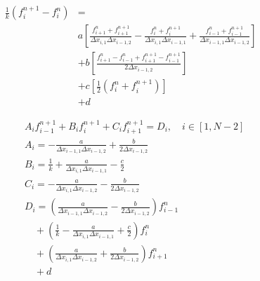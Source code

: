 \documentclass{article}
\begin{document}
    \begin{equation}
        \begin{split}
            \frac{1}{k}\left(f_i^{n+1} - f_i^n\right) &=
            \\
            & a \left[
                    \frac{f_{i+1}^n + f_{i+1}^{n+1}}
                        {\Delta x_{i,1} \Delta x_{i-1,2}}
                    - \frac{f_i^n + f_i^{n+1}}
                        {\Delta x_{i,1} \Delta x_{i-1,1}}
                    + \frac{f_{i-1}^n + f_{i-1}^{n+1}}
                        {\Delta x_{i-1,1} \Delta x_{i-1,2}}
                     \right]
            \\
            & + b \left[ 
                    \frac{f_{i+1}^n -f_{i-1}^n + f_{i+1}^{n+1} - f_{i-1}^{n+1}}
                        {2 \Delta x_{i-1,2}}
                     \right]
            \\
            & + c \left[ 
                \frac{1}{2} \left( f_i^n + f_i^{n+1} \right)
                     \right]
            \\
            & + d
        \end{split}
    \end{equation}

    \begin{equation}
        \begin{split}
            &A_i f_{i-1}^{n+1} + B_i f_i^{n+1} + C_i f_{i+1}^{n+1} = D_i, \quad i \in [1,N-2]
            \\
            &A_i =
            -\frac{a}{\Delta x_{i-1,1} \Delta x_{i-1,2}} + \frac{b}{2 \Delta x_{i-1,2}}
            \\
            &B_i =
            \frac{1}{k} + \frac{a}{\Delta x_{i,1} \Delta x_{i-1,1}} - \frac{c}{2}
            \\
            &C_i =
            -\frac{a}{\Delta x_{i,1} \Delta x_{i-1,2}} - \frac{b}{2 \Delta x_{i-1,2}}
            \\
            &D_i =
            \left(\frac{a}{\Delta x_{i-1,1} \Delta x_{i-1,2}} - \frac{b}{2 \Delta x_{i-1,2}}
                \right) f_{i-1}^{n}
            \\
            &\quad + \left( \frac{1}{k} - \frac{a}{\Delta x_{i,1} \Delta x_{i-1,1}}
                + \frac{c}{2} \right) f_i^n
            \\
            &\quad + \left(\frac{a}{\Delta x_{i,1} \Delta x_{i-1,2}} +
                \frac{b}{2 \Delta x_{i-1,2}}\right) f_{i+1}^{n}
            \\
            &\quad + d
        \end{split}
    \end{equation}
\end{document}
